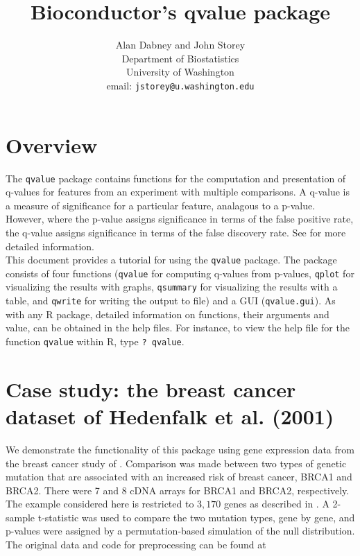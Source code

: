 \documentclass[11pt]{article}
\newcommand{\Rfunction}[1]{{\texttt{#1}}}
\newcommand{\Rpackage}[1]{{\texttt{#1}}}
\begin{document}
\title{Bioconductor's qvalue package}
\author{Alan Dabney and John Storey \\
Department of Biostatistics \\
University of Washington \\
email: \texttt{jstorey@u.washington.edu}}

\maketitle

\tableofcontents


\section{Overview}

The \Rpackage{qvalue} package contains functions for the computation and presentation of q-values for 
features from an experiment with multiple comparisons.  A q-value is a measure of significance for a 
particular feature, analagous to a p-value.  However, where the p-value assigns significance in terms 
of the false positive rate, the q-value assigns significance in terms of the false discovery rate.  See 
\cite{storey:tibs:2003} for more detailed information.\\

This document provides a tutorial for using the \texttt{qvalue} package.  The package consists of four 
functions (\Rfunction{qvalue} for computing q-values from p-values, \Rfunction{qplot} for visualizing the 
results with graphs, \Rfunction{qsummary} for visualizing the results with a table, and \Rfunction{qwrite} for 
writing the output to file) and a GUI (\Rfunction{qvalue.gui}).  As with any R package, detailed information 
on functions, their arguments and value, can be obtained in the help files. For instance, to view the help 
file for the function \Rfunction{qvalue} within R, type \texttt{? qvalue}. \\

\section{Case study: the breast cancer dataset of Hedenfalk et al. (2001)}

We demonstrate the functionality of this package using gene expression data from the breast cancer study 
of \cite{hedenfalk:etal:2001}.  Comparison was made between two types of genetic mutation that are 
associated with an increased risk of breast cancer, BRCA1 and BRCA2.  There were 7 and 8 cDNA arrays for 
BRCA1 and BRCA2, respectively.  The example considered here is restricted to $3,170$ genes as described 
in \cite{storey:tibs:2003}.  A 2-sample t-statistic was used to compare the two mutation types, gene by 
gene, and p-values were assigned by a permutation-based simulation of the null distribution.  The original 
data and code for preprocessing can be found at 
\end{document}
